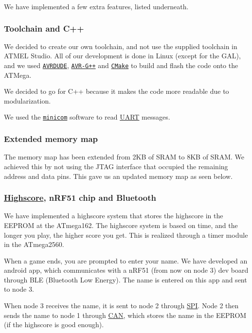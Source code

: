 We have implemented a few extra features, listed underneath.

\subsubsection*{Toolchain and C++}

We decided to create our own toolchain, and not use the supplied toolchain in A\+T\+M\+EL Studio. All of our development is done in Linux (except for the G\+AL), and we used \href{http://www.nongnu.org/avrdude/}{\tt A\+V\+R\+D\+U\+DE}, \href{http://www.nongnu.org/avr-libc/}{\tt A\+V\+R-\/\+G++} and \href{https://cmake.org/}{\tt C\+Make} to build and flash the code onto the A\+T\+Mega.

We decided to go for C++ because it makes the code more readable due to modularization.

We used the \href{https://help.ubuntu.com/community/Minicom}{\tt minicom} software to read \hyperlink{class_u_a_r_t}{U\+A\+RT} messages.

\subsubsection*{Extended memory map}

The memory map has been extended from 2\+KB of S\+R\+AM to 8\+KB of S\+R\+AM. We achieved this by not using the J\+T\+AG interface that occupied the remaining address and data pins. This gave us an updated memory map as seen below.



\subsubsection*{\hyperlink{namespace_highscore}{Highscore}, n\+R\+F51 chip and Bluetooth}

We have implemented a highscore system that stores the highscore in the E\+E\+P\+R\+OM at the A\+Tmega162. The highscore system is based on time, and the longer you play, the higher score you get. This is realized through a timer module in the A\+Tmega2560.

When a game ends, you are prompted to enter your name. We have developed an android app, which communicates with a n\+R\+F51 (from now on node 3) dev board through B\+LE (Bluetooth Low Energy). The name is entered on this app and sent to node 3.

When node 3 receives the name, it is sent to node 2 through \hyperlink{namespace_s_p_i}{S\+PI}. Node 2 then sends the name to node 1 through \hyperlink{class_c_a_n}{C\+AN}, which stores the name in the E\+E\+P\+R\+OM (if the highscore is good enough).

